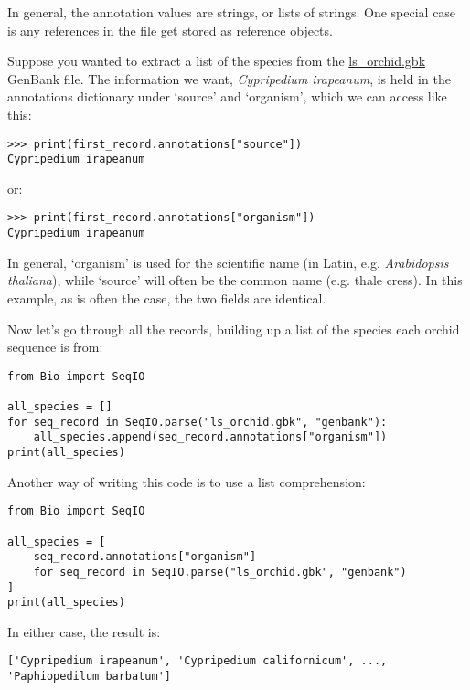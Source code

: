 In general, the annotation values are strings, or lists of strings.  One special case is any references in the file get stored as reference objects.

Suppose you wanted to extract a list of the species from the \href{https://raw.githubusercontent.com/biopython/biopython/master/Doc/examples/ls_orchid.gbk}{ls\_orchid.gbk} GenBank file.  The information we want, \emph{Cypripedium irapeanum}, is held in the annotations dictionary under `source' and `organism', which we can access like this:

\begin{verbatim}
>>> print(first_record.annotations["source"])
Cypripedium irapeanum
\end{verbatim}

\noindent or:

\begin{verbatim}
>>> print(first_record.annotations["organism"])
Cypripedium irapeanum
\end{verbatim}

In general, `organism' is used for the scientific name (in Latin, e.g. \textit{Arabidopsis thaliana}),
while `source' will often be the common name (e.g. thale cress).  In this example, as is often the case,
the two fields are identical.

Now let's go through all the records, building up a list of the species each orchid sequence is from:

\begin{verbatim}
from Bio import SeqIO

all_species = []
for seq_record in SeqIO.parse("ls_orchid.gbk", "genbank"):
    all_species.append(seq_record.annotations["organism"])
print(all_species)
\end{verbatim}

Another way of writing this code is to use a list comprehension:

\begin{verbatim}
from Bio import SeqIO

all_species = [
    seq_record.annotations["organism"]
    for seq_record in SeqIO.parse("ls_orchid.gbk", "genbank")
]
print(all_species)
\end{verbatim}

\noindent In either case, the result is:

\begin{verbatim}
['Cypripedium irapeanum', 'Cypripedium californicum', ..., 'Paphiopedilum barbatum']
\end{verbatim}

